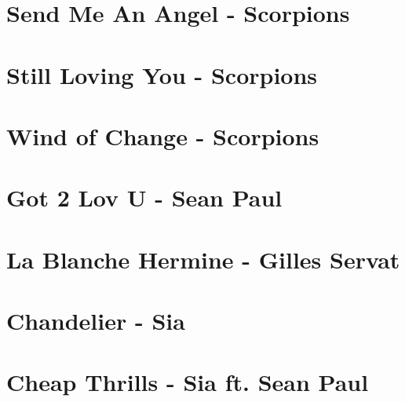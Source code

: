 \documentclass{guitartabs}
\begin{document}
\section{Send Me An Angel - Scorpions}
\begin{guitar}

\end{guitar}


\section{Still Loving You - Scorpions}
\begin{guitar}

\end{guitar}

\section*{Wind of Change - Scorpions}
\begin{guitar}

\end{guitar}

\section{Got 2 Lov U - Sean Paul}
\begin{guitar}

\end{guitar}



\section{La Blanche Hermine - Gilles Servat}
\begin{guitar}

\end{guitar}

\section{Chandelier - Sia}
\begin{guitar}

\end{guitar}

\section{Cheap Thrills - Sia ft. Sean Paul}
\begin{guitar}

\end{guitar}
\end{document}
